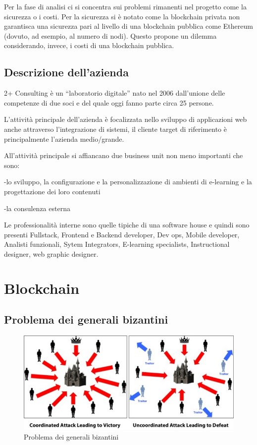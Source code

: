 \documentclass[11pt,a4paper,titlepage, twoside, openright]{report}
\begin{document}
Per la fase di analisi ci si concentra sui problemi rimanenti nel progetto come la sicurezza o i costi.
Per la sicurezza si è notato come la blockchain privata non garantisca una sicurezza pari al livello di una blockchain pubblica come Ethereum (dovuto, ad esempio, al numero di nodi). Questo propone un dilemma considerando, invece, i costi di una blockchain pubblica.


\section{Descrizione dell'azienda}
2+ Consulting è un “laboratorio digitale” nato nel 2006 dall’unione delle competenze di due soci e del quale oggi fanno parte circa 25 persone.

L’attività principale dell’azienda è focalizzata nello sviluppo di applicazioni web anche attraverso l’integrazione di sistemi, il cliente target di riferimento è principalmente l’azienda medio/grande.

All’attività principale si affiancano due business unit non meno importanti che sono:

-lo sviluppo, la configurazione e la personalizzazione  di ambienti di e-learning e la progettazione dei loro contenuti

-la consulenza esterna

Le professionalità interne sono quelle tipiche di una software house e quindi sono presenti Fullstack, Frontend e Backend developer, Dev ops,  Mobile developer, Analisti funzionali, Sytem Integrators, E-learning specialists, Instructional designer, web graphic designer.

\chapter{Blockchain}
\section{Problema dei generali bizantini}
\begin{figure}[h]
	\includegraphics[width=\textwidth]{BF}
	\centering
	\caption{Problema dei generali bizantini}
	\label{fig:ByzantinFault}
\end{figure}
\end{document}
